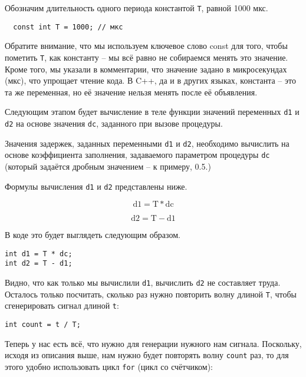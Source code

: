 \documentclass[../sparc.tex]{subfiles}
\begin{document}
Обозначим длительность одного периода константой \texttt{T}, равной 1000 мкс.

\begin{verbatim}
  const int T = 1000; // мкс
\end{verbatim}

Обратите внимание, что мы используем ключевое слово const для того, чтобы
пометить \texttt{T}, как константу -- мы всё равно не собираемся менять это
значение.  Кроме того, мы указали в комментарии, что значение задано в
микросекундах (мкс), что упрощает чтение кода.  В C++, да и в других языках,
константа -- это та же переменная, но её значение нельзя менять после её
объявления.

Следующим этапом будет вычисление в теле функции значений переменных \texttt{d1}
и \texttt{d2} на основе значения \texttt{dc}, заданного при вызове процедуры.

Значения задержек, заданных переменными \texttt{d1} и \texttt{d2}, необходимо
вычислить на основе коэффициента заполнения, задаваемого параметром процедуры
\texttt{dc} (который задаётся дробным значением -- к примеру, 0.5.)

Формулы вычисления \texttt{d1} и \texttt{d2} представлены ниже.

\begin{equation}
  \mbox{d1} = \mbox{T} * \mbox{dc}
  \label{Формула вычисления времени подачи сигнала ``HIGH''}
\end{equation}

\begin{equation}
  \mbox{d2} = \mbox{T} - \mbox{d1}
  \label{Формула вычисления времени подачи сигнала ``LOW''}
\end{equation}

В коде это будет выглядеть следующим образом.

\begin{verbatim}
int d1 = T * dc;
int d2 = T - d1;
\end{verbatim}

Видно, что как только мы вычислили \texttt{d1}, вычислить \texttt{d2} не
составляет труда. Осталось только посчитать, сколько раз нужно повторить волну
длиной \texttt{T}, чтобы сгенерировать сигнал длиной \texttt{t}:

\begin{verbatim}
int count = t / T;
\end{verbatim}

Теперь у нас есть всё, что нужно для генерации нужного нам сигнала. Поскольку,
исходя из описания выше, нам нужно будет повторять волну \texttt{count} раз, то
для этого удобно использовать цикл \texttt{for} (цикл со счётчиком):
\end{document}
